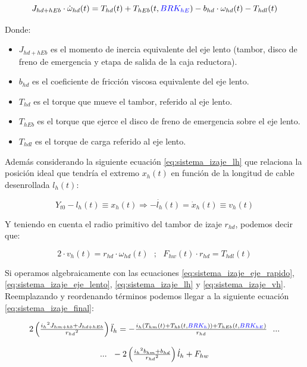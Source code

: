 \documentclass[11pt]{article}
\begin{document}
\begin{equation}
	\label{eq:sistema_izaje_eje_lento}
	J_{hd+hEb}\cdot\dot{\omega}_{hd}(t)=T_{hd}(t)+T_{hEb}(t,{\color{blue}BRK_{hE}})-b_{hd}\cdot\omega_{hd}(t)-T_{hdl}(t)
\end{equation}

Donde:

\begin{itemize}
	\item $J_{hd+hEb}$ es el momento de inercia equivalente del eje lento (tambor, disco de freno de emergencia y etapa de salida de la caja reductora).
	\item $b_{hd}$ es el coeficiente de fricción viscosa equivalente del eje lento.
	\item $T_{hd}$ es el torque que mueve el tambor, referido al eje lento.
	\item $T_{hEb}$ es el torque que ejerce el disco de freno de emergencia sobre el eje lento.
	\item $T_{hdl}$ es el torque de carga referido al eje lento.
\end{itemize}

Además considerando la siguiente ecuación \ref{eq:sistema_izaje_lh} que relaciona la posición ideal que tendría el extremo $x_{h}(t)$ en función de la longitud de cable desenrollada $l_{h}(t)$:

\begin{equation}
	\label{eq:sistema_izaje_lh}
	Y_{t0}-l_{h}(t)\equiv x_{h}(t) \Rightarrow -\dot{l_{h}}(t)=\dot{x}_{h}(t)\equiv v_{h}(t)
\end{equation}

Y teniendo en cuenta el radio primitivo del tambor de izaje $r_{hd}$, podemos decir que:

\begin{equation}
	\label{eq:sistema_izaje_vh}
	2\cdot v_{h}(t)=r_{hd}\cdot \omega_{hd}(t)\ \ \ ;\ \ \ F_{hw}(t)\cdot r_{hd}=T_{hdl}(t)
\end{equation}

Si operamos algebraicamente con las ecuaciones \ref{eq:sistema_izaje_eje_rapido}, \ref{eq:sistema_izaje_eje_lento}, \ref{eq:sistema_izaje_lh} y \ref{eq:sistema_izaje_vh}. Reemplazando y reordenando términos podemos llegar a la siguiente ecuación \ref{eq:sistema_izaje_final}:

\begin{equation}
	\label{eq:sistema_izaje_final}
	\begin{matrix}
		2\left ( \frac{{i_{h}}^{2}J_{hm+hb}+J_{hd+hEb}}{{r_{hd}}^{2}} \right )\ddot{l}_{h}=-\frac{i_{h}\left ( T_{hm}(t)+T_{hb}(t,{\color{blue}BRK_{h}}) \right )+T_{hEb}(t,{\color{blue}BRK_{hE}})}{r_{hd}}\ \ ...
		\\
		\\
		...\ \ -2\left ( \frac{{i_{h}}^{2}b_{hm}+b_{hd}}{{r_{hd}}^{2}} \right )\dot{l}_{h}+F_{hw}
	\end{matrix}
\end{equation}
\end{document}
